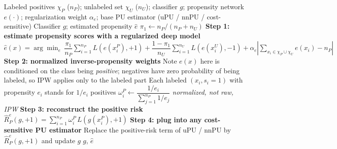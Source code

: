 \documentclass{article}
\begin{document}
\begin{algorithm}[!h]
\renewcommand{\algorithmicrequire}{\textbf{Input:}} %
\renewcommand{\algorithmicensure}{\textbf{Output:}} %
	\caption{PUe (normalized inverse-propensity weighting for biased PU learning)} %
	\begin{algorithmic}[1] %
	    \REQUIRE
	    Labeled positives $\chi_{P}$ ($n_{P}$); unlabeled set $\chi_{U}$ ($n_{U}$);
	    classifier $g$; propensity network $e(\cdot)$; regularization weight $\alpha_{e}$;
	    base PU estimator (uPU / nnPU / cost-sensitive)
	    \ENSURE
	    Classifier $g$; estimated propensity $\hat{e}$
	    \STATE $\pi_{1}\leftarrow n_{P}/(n_{P}+n_{U})$
	    \STATE \textbf{Step 1: estimate propensity scores with a regularized deep model}
	    \STATE $\hat{e}(x)=\arg\min_{e}\ \dfrac{\pi_{1}}{n_{P}}\sum_{i=1}^{n_{P}}L\!\left(e(x_{i}^{P}),+1\right)
	    +\dfrac{1-\pi_{1}}{n_{U}}\sum_{i=1}^{n_{U}}L\!\left(e(x_{i}^{U}),-1\right)
	    +\alpha_{e}\left|\sum_{x_{i}\in\chi_{P}\cup\chi_{U}}e(x_{i})-n_{P}\right|$ %
	    \STATE \textbf{Step 2: normalized inverse-propensity weights}
	    \STATE \quad Note $e(x)$ here is conditioned on the class being \emph{positive};
	    negatives have zero probability of being labeled, so IPW applies only to the labeled part %
	    \STATE \quad Each labeled $(x_{i},s_{i}=1)$ with propensity $e_{i}$ stands for $1/e_{i}$ positives
	    \STATE \quad $\omega_{i}^{P}\leftarrow \dfrac{1/e_{i}}{\sum_{j=1}^{n_{P}}1/e_{j}}$
	    \hfill \emph{normalized, not raw, IPW} %
	    \STATE \textbf{Step 3: reconstruct the positive risk}
	    \STATE \quad $\hat{R}_{P}^{e}(g,+1)=\sum_{i=1}^{n_{P}}\omega_{i}^{P}\,L\!\left(g(x_{i}^{P}),+1\right)$
	    \STATE \textbf{Step 4: plug into any cost-sensitive PU estimator}
	    \STATE Replace the positive-risk term of uPU / nnPU by $\hat{R}_{P}^{e}(g,+1)$ and update $g$ %
	    \ENDWHILE
		\RETURN $g$, $\hat{e}$
	\end{algorithmic}
\end{algorithm}
\end{document}

